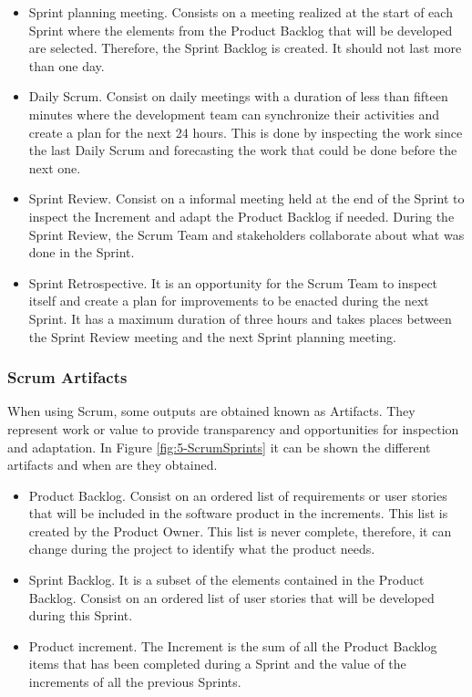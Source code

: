 \begin{itemize}
	\item Sprint planning meeting. Consists on a meeting realized at the start of each Sprint where the elements from the Product Backlog that will be developed are selected. Therefore, the Sprint Backlog is created. It should not last more than one day.
	
	\item Daily Scrum. Consist on daily meetings with a duration of less than fifteen minutes where the development team can synchronize their activities and create a plan for the next 24 hours. This is done by inspecting the work since the last Daily Scrum and forecasting the work that could be done before the next one.
	
	\item Sprint Review. Consist on a informal meeting held at the end of the Sprint to inspect the Increment and adapt the Product Backlog if needed. During the Sprint Review, the Scrum Team and stakeholders collaborate about what was done in the Sprint.
	
	\item Sprint Retrospective. It is an opportunity for the Scrum Team to inspect itself and create a plan for improvements to be enacted during the next Sprint. It has a maximum duration of three hours and takes places between the Sprint Review meeting and the next Sprint planning meeting.
\end{itemize}


\subsubsection{Scrum Artifacts}
When using Scrum, some outputs are obtained known as Artifacts. They represent work or value to provide transparency and opportunities for inspection and adaptation. In Figure \ref{fig:5-ScrumSprints} it can be shown the different artifacts and when are they obtained.

\begin{itemize}
	\item Product Backlog. Consist on an ordered list of requirements or user stories that will be included in the software product in the increments. This list is created by the Product Owner. This list is never complete, therefore, it can change during the project to identify what the product needs. 
	
	\item Sprint Backlog. It is a subset of the elements contained in the Product Backlog. Consist on an ordered list of user stories that will be developed during this Sprint.
	
	\item Product increment. The Increment is the sum of all the Product Backlog items that has been completed during a Sprint and the value of the increments of all the previous Sprints.
\end{itemize}


